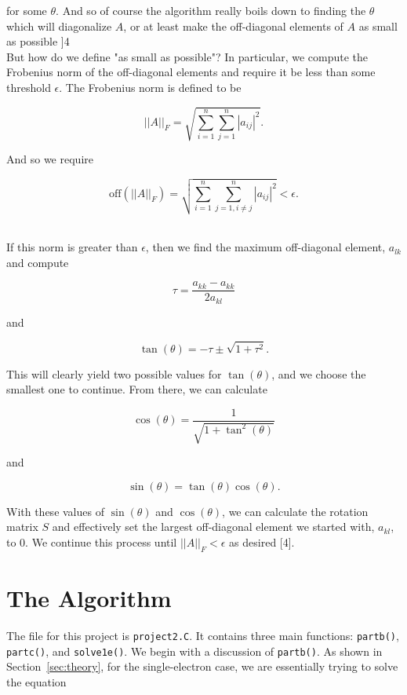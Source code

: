 \documentclass[12pt]{article}
\numberwithin{equation}{section}
\begin{document}
\noindent for some $\theta$.  And so of course the algorithm really boils down to finding the $\theta$ which will diagonalize $A$, or at least make the off-diagonal elements of $A$ as small as possible ]4\.  
\\\indent But how do we define "as small as possible"?  In particular, we compute the Frobenius norm of the off-diagonal elements and require it be less than some threshold $\epsilon$.  The Frobenius norm is defined to be 

\begin{equation}
\label{eq:frob}
||A||_{F} = \sqrt{\sum_{i=1}^{n}\sum_{j=1}^{n}|a_{ij}|^{2}}.
\end{equation}

\noindent And so we require

\begin{equation}
\text{off}(||A||_{F}) = \sqrt{\sum_{i=1}^{n}\sum_{j=1,i\neq j}^{n}|a_{ij}|^{2}}<\epsilon.
\end{equation}

\\\indent If this norm is greater than $\epsilon$, then we find the maximum off-diagonal element, $a_{lk}$ and compute

$$\tau=\frac{a_{kk}-a_{kk}}{2a_{kl}}$$

\noindent and 

$$\tan(\theta)=-\tau\pm\sqrt{1+\tau^2}.$$

\noindent This will clearly yield two possible values for $\tan(\theta)$, and we choose the smallest one to continue.  From there, we can calculate

$$\cos(\theta)=\frac{1}{\sqrt{1+\tan^{2}(\theta)}}$$

\noindent and

$$\sin(\theta)=\tan(\theta)\cos(\theta).$$

\noindent With these values of $\sin(\theta)$ and $\cos(\theta)$, we can calculate the rotation matrix $S$ and effectively set the largest off-diagonal element we started with, $a_{kl}$, to 0.  We continue this process until $||A||_{F}<\epsilon$ as desired [4].

\section{The Algorithm}
\label{sec:algorithm}
The file for this project is \texttt{project2.C}.  It contains three main functions: \texttt{partb()}, \texttt{partc()}, and \texttt{solve1e()}.  We begin with a discussion of \texttt{partb()}.  As shown in Section~\ref{sec:theory}, for the single-electron case, we are essentially trying to solve the equation
\end{document}
